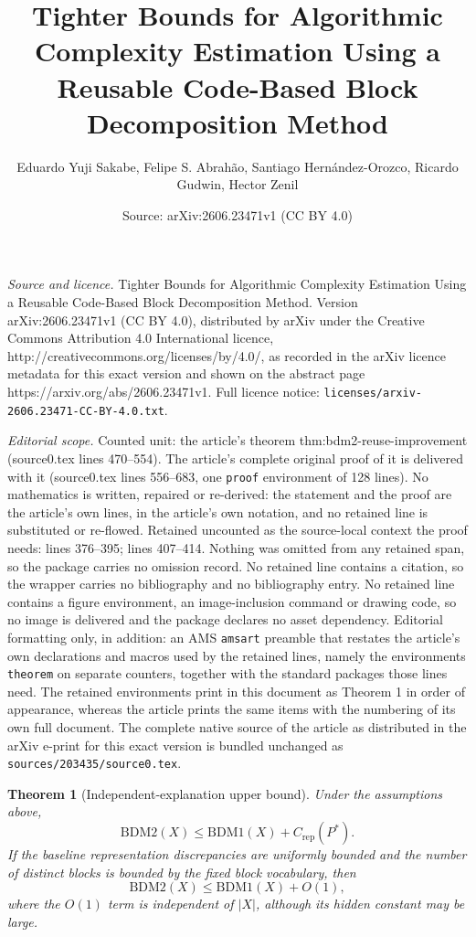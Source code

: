 \documentclass[10pt,a4paper]{amsart}
\title{Tighter Bounds for Algorithmic Complexity Estimation Using a Reusable Code-Based Block Decomposition Method}
\author{Eduardo Yuji Sakabe, Felipe S. Abrah\~ao, Santiago Hern\'andez-Orozco, Ricardo Gudwin, Hector Zenil}
\date{Source: arXiv:2606.23471v1 (CC BY 4.0)}
\newtheorem{theorem}{Theorem}
\begin{document}
\maketitle

\noindent\emph{Source and licence.} Tighter Bounds for Algorithmic Complexity Estimation Using a Reusable Code-Based Block Decomposition Method. Version arXiv:2606.23471v1 (CC BY 4.0), distributed by arXiv under the Creative Commons Attribution 4.0 International licence, http://creativecommons.org/licenses/by/4.0/, as recorded in the arXiv licence metadata for this exact version and shown on the abstract page https://arxiv.org/abs/2606.23471v1. Full licence notice: \texttt{licenses/arxiv-2606.23471-CC-BY-4.0.txt}.\par\smallskip

\noindent\textit{Editorial scope.} Counted unit: the article's theorem thm:bdm2-reuse-improvement (source0.tex lines 470--554). The article's complete original proof of it is delivered with it (source0.tex lines 556--683, one \texttt{proof} environment of 128 lines). No mathematics is written, repaired or re-derived: the statement and the proof are the article's own lines, in the article's own notation, and no retained line is substituted or re-flowed.  Retained uncounted as the source-local context the proof needs: lines 376--395; lines 407--414.  Nothing was omitted from any retained span, so the package carries no omission record.  No retained line contains a citation, so the wrapper carries no bibliography and no bibliography entry.  No retained line contains a figure environment, an image-inclusion command or drawing code, so no image is delivered and the package declares no asset dependency.  Editorial formatting only, in addition: an AMS \texttt{amsart} preamble that restates the article's own declarations and macros used by the retained lines, namely the environments \texttt{theorem} on separate counters, together with the standard packages those lines need.  The retained environments print in this document as Theorem 1 in order of appearance, whereas the article prints the same items with the numbering of its own full document.  The complete native source of the article as distributed in the arXiv e-print for this exact version is bundled unchanged as \texttt{sources/203435/source0.tex}.
\begin{theorem}[Independent-explanation upper bound]
\label{thm:bdm2-independent-limit}
Under the assumptions above,
\[
\mathrm{BDM2}(X)
\leq
\mathrm{BDM1}(X)
+
C_{\mathrm{rep}}(P^*).
\]
If the baseline representation discrepancies are uniformly bounded and the number of distinct blocks is bounded by the fixed block vocabulary, then
\[
\mathrm{BDM2}(X)
\leq
\mathrm{BDM1}(X)
+
O(1),
\]
where the \(O(1)\) term is independent of \(|X|\), although its hidden constant may be large.
\end{theorem}
\end{document}
